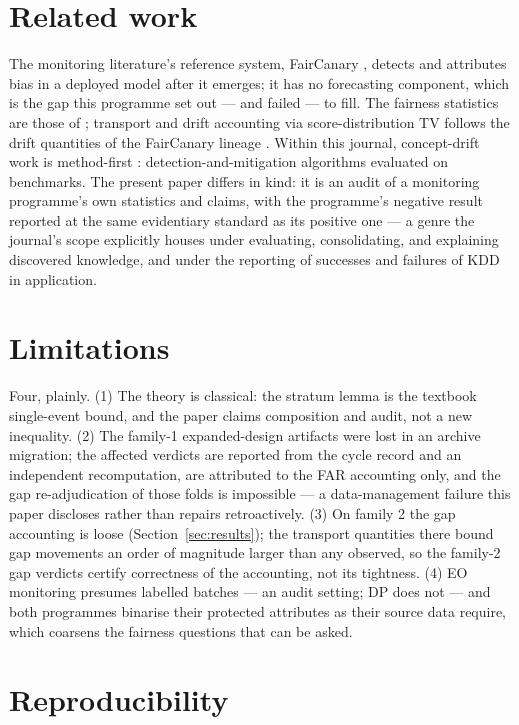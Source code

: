 \documentclass[11pt]{article}
\begin{document}
\section{Related work}

The monitoring literature's reference system, FairCanary
\cite{faircanary}, detects and attributes bias in a deployed model
after it emerges; it has no forecasting component, which is the gap
this programme set out --- and failed --- to fill. The fairness
statistics are those of \cite{dwork2012,hardt2016}; transport and
drift accounting via score-distribution TV follows the drift
quantities of the FairCanary lineage \cite{faircanary}. Within
this journal, concept-drift work is method-first
\cite{crypsis}: detection-and-mitigation algorithms evaluated on
benchmarks. The present paper differs in kind: it is an audit of a
monitoring programme's own statistics and claims, with the
programme's negative result reported at the same evidentiary
standard as its positive one --- a genre the journal's scope
explicitly houses under evaluating, consolidating, and explaining
discovered knowledge, and under the reporting of successes and
failures of KDD in application.

\section{Limitations}

Four, plainly. (1) The theory is classical: the stratum lemma is
the textbook single-event bound, and the paper claims composition
and audit, not a new inequality. (2) The family-1 expanded-design
artifacts were lost in an archive migration; the affected verdicts
are reported from the cycle record and an independent
recomputation, are attributed to the FAR accounting only, and the
gap re-adjudication of those folds is impossible --- a
data-management failure this paper discloses rather than repairs
retroactively. (3) On family 2 the gap accounting is loose
(Section~\ref{sec:results}); the transport quantities there bound
gap movements an order of magnitude larger than any observed, so
the family-2 gap verdicts certify correctness of the accounting,
not its tightness. (4) EO monitoring presumes labelled batches ---
an audit setting; DP does not --- and both programmes binarise
their protected attributes as their source data require, which
coarsens the fairness questions that can be asked.

\section{Reproducibility}
\label{sec:repro}
\end{document}
